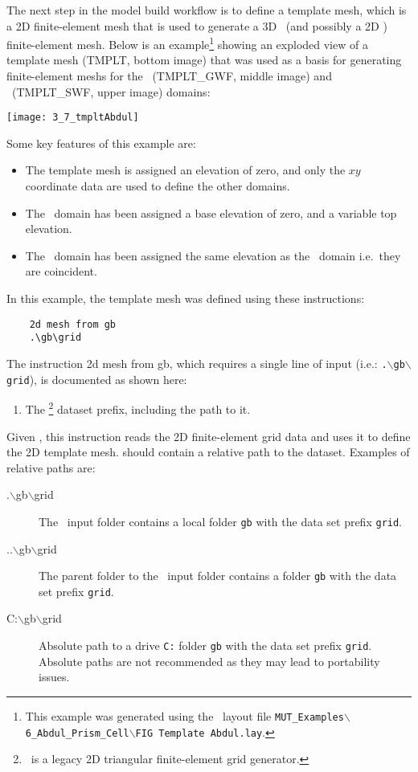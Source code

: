 \label{texfile:TemplateMesh}
The next step in the model build workflow is to define a template mesh, which is a 2D finite-element mesh that is used to generate a 3D \gwf\ (and possibly a 2D \swf) finite-element mesh.   Below is an example\footnote{This example was generated using the \tecplot\ layout file \texttt{MUT\_Examples$\backslash$6\_Abdul\_Prism\_Cell$\backslash$FIG Template Abdul.lay}. }
  showing an exploded view of a template mesh ({\sf TMPLT}, bottom image) that was used as a basis for generating  finite-element meshs for the \gwf\ ({\sf TMPLT\_GWF}, middle image) and \swf\ ({\sf TMPLT\_SWF}, upper image) domains:

    \texttt{[image: 3\_7\_tmpltAbdul]}

Some key features of this example are:
\begin{itemize}
  \item The template mesh is assigned an elevation of zero, and only the $xy$ coordinate data are used to define the other domains.
  \item The \gwf\ domain has been assigned a base elevation of zero, and a variable top elevation.
  \item The \swf\ domain has been assigned the same elevation as the \gwf\ domain i.e.\ they are coincident.
\end{itemize}

\pagebreak
 In this example, the template mesh was defined using these instructions:
 \squish
\begin{verbatim}
    2d mesh from gb
    .\gb\grid
\end{verbatim}
The instruction \textsf{2d mesh from gb}, which requires a single line of input (i.e.: \texttt{.$\backslash$gb$\backslash$grid}), is documented as shown here:

    {
        \squish
        \begin{enumerate}
        \item {}  The \gb\footnote{\gb\ is a legacy 2D triangular finite-element grid generator.} dataset prefix, including the path to it.
        \end{enumerate}
        Given , this instruction reads the 2D finite-element grid data and uses it to define the 2D template mesh.   should contain a relative path to the dataset.  Examples of relative paths are:
        \begin{description}
        \item[.$\backslash$gb$\backslash$grid] The \mut\ input folder contains a local folder \texttt{gb} with the data set prefix \texttt{grid}.
        \item[..$\backslash$gb$\backslash$grid] The parent folder to the \mut\ input folder contains a folder \texttt{gb} with the data set prefix \texttt{grid}.
        \item[C:$\backslash$gb$\backslash$grid] Absolute path to a drive \texttt{C:} folder \texttt{gb} with the data set prefix \texttt{grid}.  Absolute paths are not recommended as they may lead to portability issues.
        \end{description}
        \squish
    }

